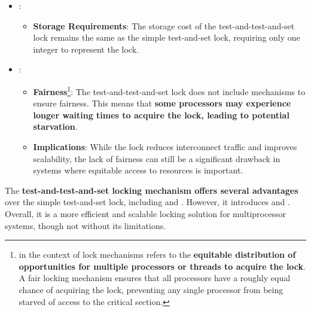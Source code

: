\begin{itemize}
    \item {}:
    \begin{itemize}
        \item \textbf{Storage Requirements}: The storage cost of the test-and-test-and-set lock remains the same as the simple test-and-set lock, requiring only one integer to represent the lock.
    \end{itemize}

    \item {}:
    \begin{itemize}
        \item \textbf{Fairness}\footnote{ in the context of lock mechanisms refers to the \textbf{equitable distribution of opportunities for multiple processors or threads to acquire the lock}. A fair locking mechanism ensures that all processors have a roughly equal chance of acquiring the lock, preventing any single processor from being starved of access to the critical section.}: The test-and-test-and-set lock does not include mechanisms to ensure fairness. This means that \textbf{some processors may experience longer waiting times to acquire the lock, leading to potential starvation}.
        \item \textbf{Implications}: While the lock reduces interconnect traffic and improves scalability, the lack of fairness can still be a significant drawback in systems where equitable access to resources is important.
    \end{itemize}
\end{itemize}
The \textbf{test-and-test-and-set locking mechanism offers several advantages} over the simple test-and-set lock, including  and . However, it introduces  and . Overall, it is a more efficient and scalable locking solution for multiprocessor systems, though not without its limitations.
